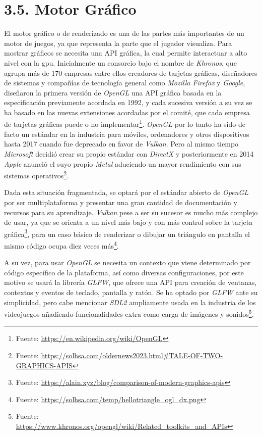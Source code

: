 \section*{3.5. Motor Gráfico}\label{sec:graphics_engine}

El motor gráfico o de renderizado es una de las partes más importantes de un motor de juegos, ya que representa la parte
que el jugador visualiza. Para mostrar gráficos se necesita una API gráfica, la cual permite interactuar a alto nivel
con la \gls{gpu}. Inicialmente un consorcio bajo el nombre de \textit{Khronos}\cite{khronos}, que agrupa más de 170 empresas entre ellos creadores de
tarjetas gráficas, diseñadores de sistemas y compañías de tecnología general como \textit{Mozilla Firefox} y \textit{Google}, diseñaron la primera versión de
\textit{OpenGL}\cite{opengl} una API gráfica basada en la especificación previamente acordada en 1992, y cada sucesiva versión a su vez se ha basado
en las nuevas extensiones acordadas por el comité, que cada empresa de tarjetas gráficas puede o no implementar\footnote{Fuente: \url{https://en.wikipedia.org/wiki/OpenGL}}. 
\textit{OpenGL} por lo tanto ha sido de facto un estándar en la industria para móviles, ordenadores y otros dispositivos hasta 2017 cuando fue deprecado en favor de \textit{Vulkan}\cite{vulkan}.
Pero al mismo tiempo \textit{Microsoft} decidió crear su propio estándar con \textit{DirectX}\cite{direct11} y posteriormente en 2014 \textit{Apple} anunció el suyo propio \textit{Metal}\cite{metal} aduciendo un
mayor rendimiento con sus sistemas operativos\footnote{Fuente: \url{https://solhsa.com/oldernews2023.html\#TALE-OF-TWO-GRAPHICS-APIS}}.

Dada esta situación fragmentada, se optará por el estándar abierto de \textit{OpenGL} por ser multiplataforma y presentar una gran
cantidad de documentación y recursos para su aprendizaje\cite{learn-opengl}\cite{guide-to-modern-opengl}. \textit{Vulkan} pese a ser
su sucesor es mucho más complejo de usar, ya que se orienta a un nivel más bajo y con más control sobre la tarjeta gráfica\footnote{Fuente: \url{https://alain.xyz/blog/comparison-of-modern-graphics-apis}},
para un caso básico de renderizar o dibujar un triángulo en pantalla el mismo código ocupa diez veces más\footnote{Fuente: \url{https://solhsa.com/temp/hellotriangle_ogl_dx.png}}.

A su vez, para usar \textit{OpenGL} se necesita un contexto que viene determinado por código específico de la plataforma, así como
diversas configuraciones, por este motivo se usará la librería \textit{GLFW}\cite{glfw}, que ofrece una API para creación de ventanas,
contextos y eventos de teclado, pantalla y ratón. Se ha optado por \textit{GLFW} ante su simplicidad, pero cabe mencionar \textit{SDL2}\cite{sdl2}\cite{learn-sdl}
ampliamente usada en la industria de los videojuegos añadiendo funcionalidades extra como carga de imágenes y sonidos\footnote{Fuente: \url{https://www.khronos.org/opengl/wiki/Related_toolkits_and_APIs}}.

